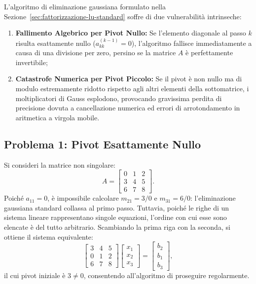 L'algoritmo di eliminazione gaussiana formulato nella Sezione~\ref{sec:fattorizzazione-lu-standard} soffre di due vulnerabilit\`a intrinseche:
\begin{enumerate}
    \item \textbf{Fallimento Algebrico per Pivot Nullo:} Se l'elemento diagonale al passo $k$ risulta esattamente nullo ($a_{kk}^{(k-1)} = 0$), l'algoritmo fallisce immediatamente a causa di una divisione per zero, persino se la matrice $A$ \`e perfettamente invertibile;
    \item \textbf{Catastrofe Numerica per Pivot Piccolo:} Se il pivot \`e non nullo ma di modulo estremamente ridotto rispetto agli altri elementi della sottomatrice, i moltiplicatori di Gauss esplodono, provocando gravissima perdita di precisione dovuta a cancellazione numerica ed errori di arrotondamento in aritmetica a virgola mobile.
\end{enumerate}

\subsection{Problema 1: Pivot Esattamente Nullo}
Si consideri la matrice non singolare:
\begin{equation}
    A = \begin{bmatrix}
        0 & 1 & 2 \\
        3 & 4 & 5 \\
        6 & 7 & 8
    \end{bmatrix}.
\end{equation}
Poich\'e $a_{11} = 0$, \`e impossibile calcolare $m_{21} = 3/0$ e $m_{31} = 6/0$: l'eliminazione gaussiana standard collassa al primo passo.
Tuttavia, poich\'e le righe di un sistema lineare rappresentano singole equazioni, l'ordine con cui esse sono elencate \`e del tutto arbitrario. Scambiando la prima riga con la seconda, si ottiene il sistema equivalente:
\begin{equation}
    \begin{bmatrix}
        3 & 4 & 5 \\
        0 & 1 & 2 \\
        6 & 7 & 8
    \end{bmatrix}
    \begin{bmatrix} x_1 \\ x_2 \\ x_3 \end{bmatrix}
    =
    \begin{bmatrix} b_2 \\ b_1 \\ b_3 \end{bmatrix},
\end{equation}
il cui pivot iniziale \`e $3 \neq 0$, consentendo all'algoritmo di proseguire regolarmente.

